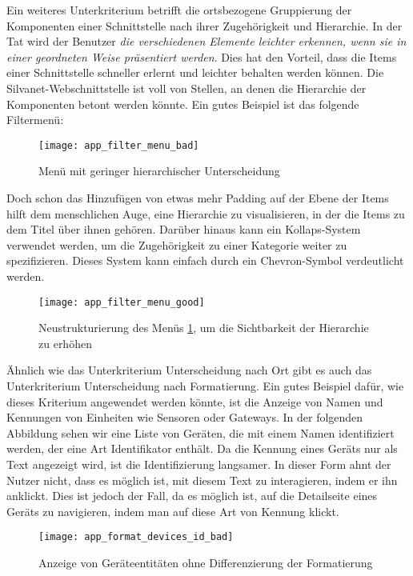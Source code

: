 Ein weiteres Unterkriterium betrifft die ortsbezogene Gruppierung der Komponenten einer Schnittstelle nach ihrer Zugehörigkeit und Hierarchie.
In der Tat wird der Benutzer \textit{die verschiedenen Elemente leichter erkennen, wenn sie in einer geordneten Weise präsentiert werden}\cite{bastienscapin}.
Dies hat den Vorteil, dass die Items einer Schnittstelle schneller erlernt und leichter behalten werden können.
Die Silvanet-Webschnittstelle ist voll von Stellen, an denen die Hierarchie der Komponenten betont werden könnte.
Ein gutes Beispiel ist das folgende Filtermenü:

\begin{figure}[H]
  \centering
  \texttt{[image: app\_filter\_menu\_bad]}
  \caption{Menü mit geringer hierarchischer Unterscheidung}
  \label{fig:app_filter_menu_bad}
\end{figure}

Doch schon das Hinzufügen von etwas mehr Padding auf der Ebene der Items hilft dem menschlichen Auge, eine Hierarchie zu visualisieren, in der die Items zu dem Titel über ihnen gehören.
Darüber hinaus kann ein Kollaps-System verwendet werden, um die Zugehörigkeit zu einer Kategorie weiter zu spezifizieren.
Dieses System kann einfach durch ein Chevron-Symbol verdeutlicht werden.

\begin{figure}[H]
  \centering
  \texttt{[image: app\_filter\_menu\_good]}
  \caption{Neustrukturierung des Menüs \ref{fig:app_filter_menu_bad}, um die Sichtbarkeit der Hierarchie zu erhöhen}
\end{figure}

Ähnlich wie das Unterkriterium Unterscheidung nach Ort gibt es auch das Unterkriterium Unterscheidung nach Formatierung.
Ein gutes Beispiel dafür, wie dieses Kriterium angewendet werden könnte, ist die Anzeige von Namen und Kennungen von Einheiten wie Sensoren oder Gateways.
In der folgenden Abbildung sehen wir eine Liste von Geräten, die mit einem Namen identifiziert werden, der eine Art Identifikator enthält.
Da die Kennung eines Geräts nur als Text angezeigt wird, ist die Identifizierung langsamer.
In dieser Form ahnt der Nutzer nicht, dass es möglich ist, mit diesem Text zu interagieren, indem er ihn anklickt.
Dies ist jedoch der Fall, da es möglich ist, auf die Detailseite eines Geräts zu navigieren, indem man auf diese Art von Kennung klickt.

\begin{figure}[H]
  \centering
  \texttt{[image: app\_format\_devices\_id\_bad]}
  \caption{Anzeige von Geräteentitäten ohne Differenzierung der Formatierung}
  \label{fig:app_format_devices_id_bad}
\end{figure}

